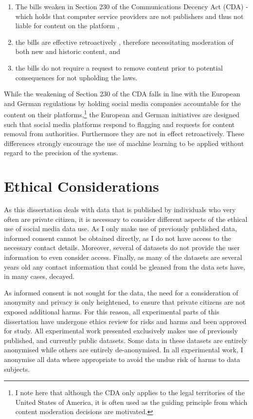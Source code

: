 \begin{enumerate}
  \item{The bills weaken \citep{Romano:2018,Stryker:2018} in Section 230 of the Communications Decency Act (CDA) - which holds that computer service providers are not publishers and thus not liable for content on the platform \citep{EFF:230},}
  \item{the bills are effective retroactively \citep{Stryker:2018}, therefore necessitating moderation of both new and historic content, and}
  \item{the bills do not require a request to remove content prior to potential consequences for not upholding the laws.}
\end{enumerate}

While the weakening of Section 230 of the CDA falls in line with the European and German regulations by holding social media companies accountable for the content on their platforms,\footnote{I note here that although the CDA only applies to the legal territories of the United States of America, it is often used as the guiding principle from which content moderation decisions are motivated.} the European and German initiatives are designed such that social media platforms respond to flagging and requests for content removal from authorities.
Furthermore they are not in effect retroactively.
These differences strongly encourage the use of machine learning to be applied without regard to the precision of the systems.

\section{Ethical Considerations}

As this dissertation deals with data that is published by individuals who very often are private citizen, it is necessary to consider different aspects of the ethical use of social media data use.
As I only make use of previously published data, informed consent cannot be obtained directly, as I do not have access to the necessary contact details.
Moreover, several of datasets do not provide the user information to even consider access.
Finally, as many of the datasets are several years old any contact information that could be gleaned from the data sets have, in many cases, decayed.

As informed consent is not sought for the data, the need for a consideration of anonymity and privacy is only heightened, to ensure that private citizens are not exposed additional harms.
For this reason, all experimental parts of this dissertation have undergone ethics review for risks and harms and been approved for study.
All experimental work presented exclusively makes use of previously published, and currently public datasets.
Some data in these datasets are entirely anonymised while others are entirely de-anonymised.
In all experimental work, I anonymise all data where appropriate to avoid the undue risk of harms to data subjects.


